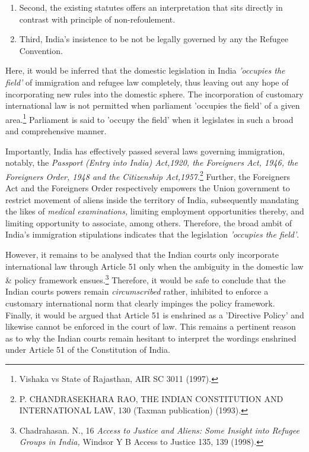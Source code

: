\begin{multicols}{2}
\begin{enumerate}[label=$\bullet$]
\item Second, the existing statutes offers an interpretation that sits directly in contrast with
principle of non-refoulement.

\item Third, India’s insistence to be not be legally governed by any the Refugee
Convention.
\end{enumerate}

\noi
Here, it would be inferred that the domestic legislation in India \textit{'occupies the field'} of
immigration and refugee law completely, thus leaving out any hope of incorporating new
rules into the domestic sphere. The incorporation of customary international law is not
permitted when parliament 'occupies the field' of a given area.\footnote{Vishaka vs State of Rajasthan, AIR SC 3011 (1997).} Parliament is said to 'occupy the field' when it legislates in such a broad and comprehensive manner.

\noi
Importantly, India has effectively passed several laws governing immigration, notably, the
\textit{Passport (Entry into India) Act,1920, the Foreigners Act, 1946, the Foreigners Order, 1948
and the Citizenship Act,1957.}\footnote{P. CHANDRASEKHARA RAO, THE INDIAN CONSTITUTION AND INTERNATIONAL LAW, 130 (Taxman publication) (1993).} Further, the Foreigners Act and the Foreigners Order
respectively empowers the Union government to restrict movement of aliens inside the
territory of India, subsequently mandating the likes of \textit{medical examinations,} limiting
employment opportunities thereby, and limiting opportunity to associate, among others.
Therefore, the broad ambit of India's immigration stipulations indicates that the legislation
\textit{'occupies the field'}.

\noi
However, it remains to be analysed that the Indian courts only incorporate international law
through Article 51 only when the ambiguity in the domestic law \& policy framework
ensues.\footnote{Chadrahasan. N., 16 \textit{Access to Justice and Aliens: Some Insight into Refugee Groups in India,} Windsor Y B Access to Justice 135, 139 (1998).} Therefore, it would be safe to conclude that the Indian courts powers remain \textit{circumscribed} rather, inhibited to enforce a customary international norm that clearly
impinges the policy framework. Finally, it would be argued that Article 51 is enshrined as a
'Directive Policy' and likewise cannot be enforced in the court of law. This remains a
pertinent reason as to why the Indian courts remain hesitant to interpret the wordings
enshrined under Article 51 of the Constitution of India.


\end{multicols}
